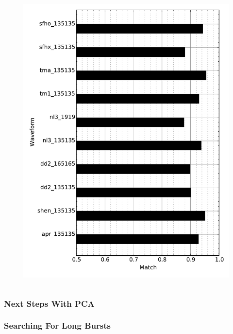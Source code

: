 \documentclass[serif,mathserif]{beamer}
\begin{document}
\begin{frame}
\begin{columns}[]
        \begin{center}
            \vspace{-0.5cm}
            \begin{figure}
                \includegraphics[width=\columnwidth]{figures/match_bars_exctestwav.pdf}
            \end{figure}
        \end{center}


    \end{columns}

\end{frame}

\begin{frame}
    \frametitle{Next Steps With PCA}
\end{frame}

\begin{frame}
    \frametitle{Searching For Long Bursts}
\end{frame}
\end{document}
